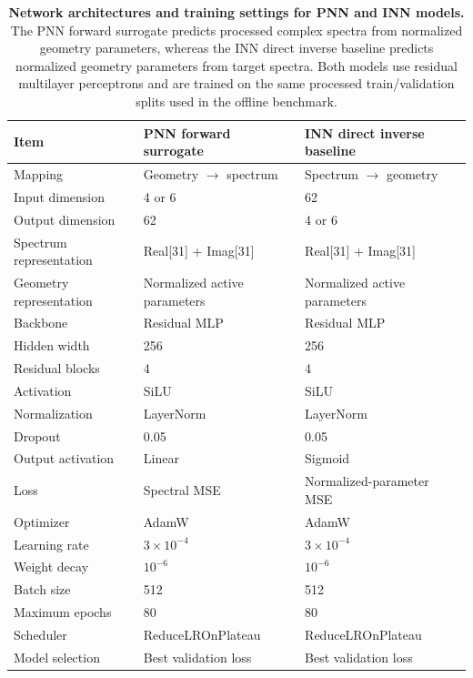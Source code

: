 \documentclass[final,1p,times]{elsarticle}
\begin{document}
\begin{table}[htbp!]
\centering
\caption{\textbf{Network architectures and training settings for PNN and INN models.}
The PNN forward surrogate predicts processed complex spectra from normalized geometry parameters, whereas the INN direct inverse baseline predicts normalized geometry parameters from target spectra. Both models use residual multilayer perceptrons and are trained on the same processed train/validation splits used in the offline benchmark.}
\label{tab:si_pnn_inn_architecture_training}
\footnotesize
\setlength{\tabcolsep}{4.0pt}
\renewcommand{\arraystretch}{1.12}
\begin{tabular}{lll}
\toprule
Item & PNN forward surrogate & INN direct inverse baseline \\
\midrule
Mapping & Geometry $\rightarrow$ spectrum & Spectrum $\rightarrow$ geometry \\
Input dimension & 4 or 6 & 62 \\
Output dimension & 62 & 4 or 6 \\
Spectrum representation & Real[31] + Imag[31] & Real[31] + Imag[31] \\
Geometry representation & Normalized active parameters & Normalized active parameters \\
Backbone & Residual MLP & Residual MLP \\
Hidden width & 256 & 256 \\
Residual blocks & 4 & 4 \\
Activation & SiLU & SiLU \\
Normalization & LayerNorm & LayerNorm \\
Dropout & 0.05 & 0.05 \\
Output activation & Linear & Sigmoid \\
Loss & Spectral MSE & Normalized-parameter MSE \\
Optimizer & AdamW & AdamW \\
Learning rate & $3\times10^{-4}$ & $3\times10^{-4}$ \\
Weight decay & $10^{-6}$ & $10^{-6}$ \\
Batch size & 512 & 512 \\
Maximum epochs & 80 & 80 \\
Scheduler & ReduceLROnPlateau & ReduceLROnPlateau \\
Model selection & Best validation loss & Best validation loss \\
\bottomrule
\end{tabular}
\end{table}
\end{document}
